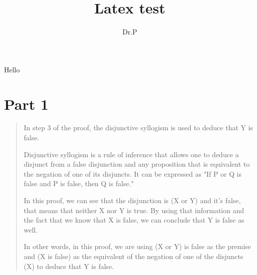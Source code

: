 \documentclass{article}
\author{Dr.P}
\title{Latex test}
\begin{document}
Hello

\section{Part 1}

\begin{quote}
  In step 3 of the proof, the disjunctive syllogism is used to deduce that Y is false.

Disjunctive syllogism is a rule of inference that allows one to deduce a disjunct from a false disjunction and any proposition that is equivalent to the negation of one of its disjuncts. It can be expressed as "If P or Q is false and P is false, then Q is false."

In this proof, we can see that the disjunction is (X or Y) and it's false, that means that neither X nor Y is true. By using that information and the fact that we know that X is false, we can conclude that Y is false as well.

In other words, in this proof, we are using (X or Y) is false as the premise and (X is false) as the equivalent of the negation of one of the disjuncts (X) to deduce that Y is false.
\end{quote}

\newpage
\end{document}
